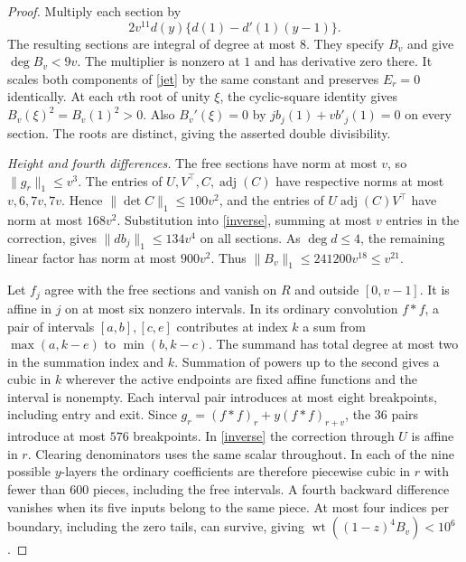 \documentclass[10pt,a4paper,reqno]{amsart}
\newcommand{\wt}{\operatorname{wt}}
\begin{document}
\begin{proof}
Multiply each section by
\[
             2v^{11}d(y)\{d(1)-d'(1)(y-1)\}.
\]
The resulting sections are integral of degree at most $8$. They specify $B_v$ and give $\deg B_v<9v$. The multiplier is nonzero at $1$ and has derivative zero there. It scales both components of \eqref{jet} by the same constant and preserves $E_r=0$ identically. At each $v$th root of unity $\xi$, the cyclic-square identity gives $B_v(\xi)^2=B_v(1)^2>0$. Also $B_v'(\xi)=0$ by $jb_j(1)+vb'_j(1)=0$ on every section. The roots are distinct, giving the asserted double divisibility.

\smallskip\noindent\emph{Height and fourth differences.}
The free sections have norm at most $v$, so $\|g_r\|_1\le v^3$. The entries of $U,V^\top,C,\operatorname{adj}(C)$ have respective norms at most $v,6,7v,7v$. Hence $\|\det C\|_1\le100v^2$, and the entries of $U\operatorname{adj}(C)V^\top$ have norm at most $168v^2$. Substitution into \eqref{inverse}, summing at most $v$ entries in the correction, gives $\|db_j\|_1\le134v^4$ on all sections. As $\deg d\le4$, the remaining linear factor has norm at most $900v^2$. Thus $\|B_v\|_1\le241200v^{18}\le v^{21}$.

Let $f_j$ agree with the free sections and vanish on $R$ and outside $[0,v-1]$. It is affine in $j$ on at most six nonzero intervals. In its ordinary convolution $f*f$, a pair of intervals $[a,b],[c,e]$ contributes at index $k$ a sum from $\max(a,k-e)$ to $\min(b,k-c)$. The summand has total degree at most two in the summation index and $k$. Summation of powers up to the second gives a cubic in $k$ wherever the active endpoints are fixed affine functions and the interval is nonempty. Each interval pair introduces at most eight breakpoints, including entry and exit. Since $g_r=(f*f)_r+y(f*f)_{r+v}$, the 36 pairs introduce at most $576$ breakpoints. In \eqref{inverse} the correction through $U$ is affine in $r$. Clearing denominators uses the same scalar throughout. In each of the nine possible $y$-layers the ordinary coefficients are therefore piecewise cubic in $r$ with fewer than $600$ pieces, including the free intervals. A fourth backward difference vanishes when its five inputs belong to the same piece. At most four indices per boundary, including the zero tails, can survive, giving $\wt((1-z)^4B_v)<10^6$.
\end{proof}
\end{document}
